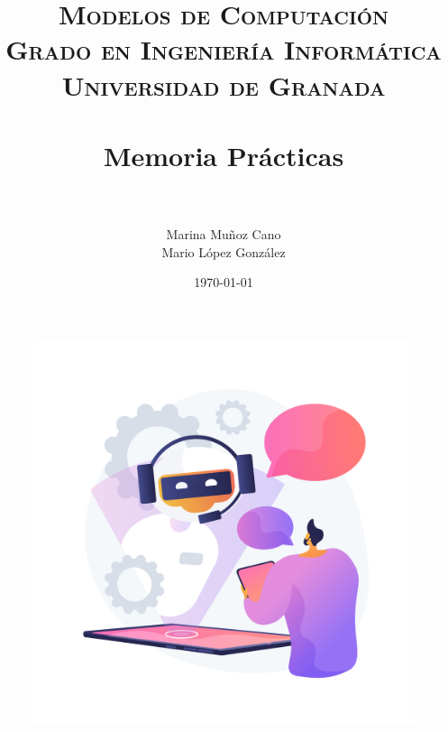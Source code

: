 

\title{	
\normalfont \normalsize 
\textsc{\textbf{Modelos de Computación} \\ Grado en Ingeniería Informática \\ Universidad de Granada} \\ [25pt] %
\horrule{0.5pt} \\[0.4cm] %
\huge Memoria Prácticas \\ %
\horrule{2pt} \\[0.5cm] %
}

\author{ 
    Marina Muñoz Cano
    \\
    Mario López González
} 

\date{\normalsize\today} %




\maketitle %

\begin{figure}[H] 
	\centering
	\includegraphics[scale=0.045]{chatbot.jpg} 
    \label{fig:chatbot}
\end{figure}

